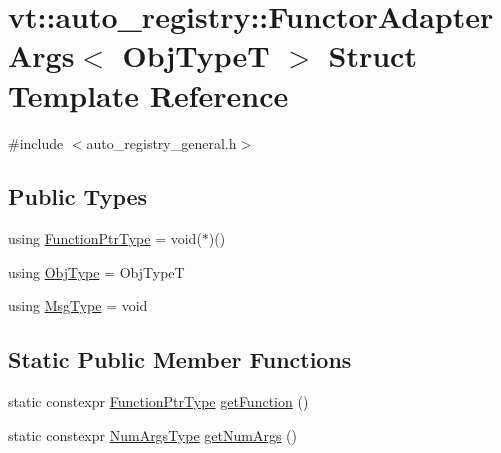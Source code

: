 \hypertarget{structvt_1_1auto__registry_1_1_functor_adapter_args_3_01_obj_type_t_01_4}{}\section{vt\+:\+:auto\+\_\+registry\+:\+:Functor\+Adapter\+Args$<$ Obj\+TypeT $>$ Struct Template Reference}
\label{structvt_1_1auto__registry_1_1_functor_adapter_args_3_01_obj_type_t_01_4}


{\ttfamily \#include $<$auto\+\_\+registry\+\_\+general.\+h$>$}

\subsection*{Public Types}
\begin{DoxyCompactItemize}
\item 
using \hyperlink{structvt_1_1auto__registry_1_1_functor_adapter_args_3_01_obj_type_t_01_4_a7f916fba5fb1c01c4aa7cd266bff6851}{Function\+Ptr\+Type} = void($\ast$)()
\item 
using \hyperlink{structvt_1_1auto__registry_1_1_functor_adapter_args_3_01_obj_type_t_01_4_abb65398167f825b9b8f8a0e440eaf886}{Obj\+Type} = Obj\+TypeT
\item 
using \hyperlink{structvt_1_1auto__registry_1_1_functor_adapter_args_3_01_obj_type_t_01_4_a99d8fa6287d00ce0ca7c7b93b69a9e23}{Msg\+Type} = void
\end{DoxyCompactItemize}
\subsection*{Static Public Member Functions}
\begin{DoxyCompactItemize}
\item 
static constexpr \hyperlink{structvt_1_1auto__registry_1_1_functor_adapter_args_3_01_obj_type_t_01_4_a7f916fba5fb1c01c4aa7cd266bff6851}{Function\+Ptr\+Type} \hyperlink{structvt_1_1auto__registry_1_1_functor_adapter_args_3_01_obj_type_t_01_4_ac8ddcc5c26304b7bbba3f9b13b0f72d4}{get\+Function} ()
\item 
static constexpr \hyperlink{namespacevt_1_1auto__registry_aebda1d9d765bc9147dc654ad0712c936}{Num\+Args\+Type} \hyperlink{structvt_1_1auto__registry_1_1_functor_adapter_args_3_01_obj_type_t_01_4_a500f114d1a088dddda86c016e80a561e}{get\+Num\+Args} ()
\end{DoxyCompactItemize}


